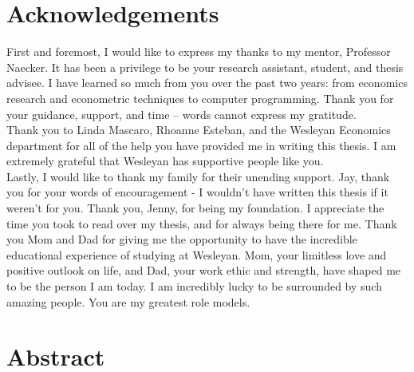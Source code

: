 \documentclass[12pt]{article}
\begin{document}


\newpage
\onehalfspacing
\tableofcontents
\thispagestyle{empty}


\newpage

\clearpage
{} 
\doublespacing
\section*{Acknowledgements}
First and foremost, I would like to express my thanks to my mentor, Professor Naecker. It has been a privilege to be your research assistant, student, and thesis advisee. I have learned so much from you over the past two years: from economics research and econometric techniques to computer programming. Thank you for your guidance, support, and time -- words cannot express my gratitude.\\

Thank you to Linda Mascaro, Rhoanne Esteban, and the Wesleyan Economics department for all of the help you have provided me in writing this thesis. I am extremely grateful that Wesleyan has supportive people like you. \\

Lastly, I would like to thank my family for their unending support. Jay, thank you for your words of encouragement - I wouldn\rq t have written this thesis if it weren\rq t for you. Thank you, Jenny, for being my foundation. I appreciate the time you took to read over my thesis, and for always being there for me. Thank you Mom and Dad for giving me the opportunity to have the incredible educational experience of studying at Wesleyan. Mom, your limitless love and positive outlook on life, and Dad, your work ethic and strength, have shaped me to be the person I am today. I am incredibly lucky to be surrounded by such amazing people. You are my greatest role models.


\newpage

\section*{Abstract}
\end{document}
